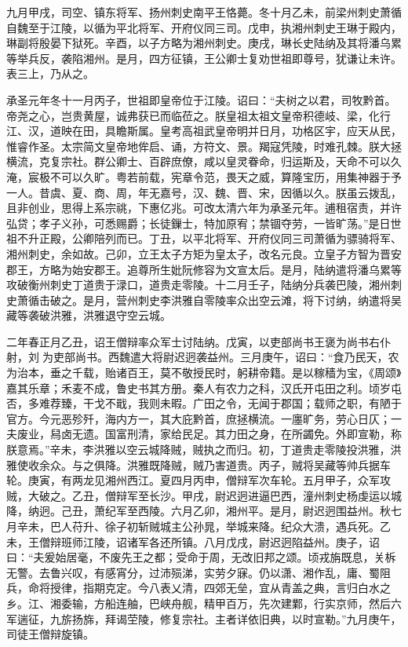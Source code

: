\documentclass[12pt,UTF8]{ctexbook}
\begin{document}
九月甲戌，司空、镇东将军、扬州刺史南平王恪薨。冬十月乙未，前梁州刺史萧循自魏至于江陵，以循为平北将军、开府仪同三司。戊申，执湘州刺史王琳于殿内，琳副将殷晏下狱死。辛酉，以子方略为湘州刺史。庚戌，琳长史陆纳及其将潘乌累等举兵反，袭陷湘州。是月，四方征镇，王公卿士复劝世祖即尊号，犹谦让未许。表三上，乃从之。

承圣元年冬十一月丙子，世祖即皇帝位于江陵。诏曰：“夫树之以君，司牧黔首。帝尧之心，岂贵黄屋，诚弗获已而临莅之。朕皇祖太祖文皇帝积德岐、梁，化行江、汉，道映在田，具瞻斯属。皇考高祖武皇帝明并日月，功格区宇，应天从民，惟睿作圣。太宗简文皇帝地侔启、诵，方符文、景。羯寇凭陵，时难孔棘。朕大拯横流，克复宗社。群公卿士、百辟庶僚，咸以皇灵眷命，归运斯及，天命不可以久淹，宸极不可以久旷。粤若前载，宪章令范，畏天之威，算隆宝历，用集神器于予一人。昔虞、夏、商、周，年无嘉号，汉、魏、晋、宋，因循以久。朕虽云拨乱，且非创业，思得上系宗祧，下惠亿兆。可改太清六年为承圣元年。逋租宿责，并许弘贷；孝子义孙，可悉赐爵；长徒鏁士，特加原宥；禁锢夺劳，一皆旷荡。”是日世祖不升正殿，公卿陪列而已。丁丑，以平北将军、开府仪同三司萧循为骠骑将军、湘州刺史，余如故。己卯，立王太子方矩为皇太子，改名元良。立皇子方智为晋安郡王，方略为始安郡王。追尊所生妣阮修容为文宣太后。是月，陆纳遣将潘乌累等攻破衡州刺史丁道贵于渌口，道贵走零陵。十二月壬子，陆纳分兵袭巴陵，湘州刺史萧循击破之。是月，营州刺史李洪雅自零陵率众出空云滩，将下讨纳，纳遣将吴藏等袭破洪雅，洪雅退守空云城。

二年春正月乙丑，诏王僧辩率众军士讨陆纳。戊寅，以吏部尚书王褒为尚书右仆射，刘为吏部尚书。西魏遣大将尉迟迥袭益州。三月庚午，诏曰：“食乃民天，农为治本，垂之千载，贻诸百王，莫不敬授民时，躬耕帝籍。是以稼穑为宝，《周颂》嘉其乐章；禾麦不成，鲁史书其方册。秦人有农力之科，汉氏开屯田之利。顷岁屯否，多难荐臻，干戈不戢，我则未暇。广田之令，无闻于郡国；载师之职，有陋于官方。今元恶殄歼，海内方一，其大庇黔首，庶拯横流。一廛旷务，劳心日仄；一夫废业，舄卤无遗。国富刑清，家给民足。其力田之身，在所蠲免。外即宣勒，称朕意焉。”辛未，李洪雅以空云城降贼，贼执之而归。初，丁道贵走零陵投洪雅，洪雅使收余众。与之俱降。洪雅既降贼，贼乃害道贵。丙子，贼将吴藏等帅兵据车轮。庚寅，有两龙见湘州西江。夏四月丙申，僧辩军次车轮。五月甲子，众军攻贼，大破之。乙丑，僧辩军至长沙。甲戌，尉迟迥进逼巴西，潼州刺史杨虔运以城降，纳迥。己丑，萧纪军至西陵。六月乙卯，湘州平。是月，尉迟迥围益州。秋七月辛未，巴人苻升、徐子初斩贼城主公孙晁，举城来降。纪众大溃，遇兵死。乙未，王僧辩班师江陵，诏诸军各还所镇。八月戊戌，尉迟迥陷益州。庚子，诏曰：“夫爰始居毫，不废先王之都；受命于周，无改旧邦之颂。顷戎旃既息，关柝无警。去鲁兴叹，有感宵分，过沛殒涕，实劳夕寐。仍以潇、湘作乱，庸、蜀阻兵，命将授律，指期克定。今八表乂清，四郊无垒，宜从青盖之典，言归白水之乡。江、湘委输，方船连舳，巴峡舟舰，精甲百万，先次建鄴，行实京师，然后六军遄征，九旂扬旆，拜谒茔陵，修复宗社。主者详依旧典，以时宣勒。”九月庚午，司徒王僧辩旋镇。
\end{document}
